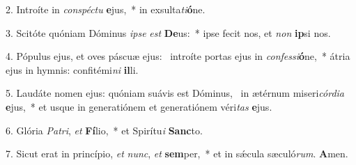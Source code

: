 2. Introíte in \textit{con}\textit{spéc}\textit{tu} \textbf{e}jus,~*  in exsulta\textit{ti}\textbf{ó}ne.\

3. Scitóte quóniam Dóminus \textit{ip}\textit{se} \textit{est} \textbf{De}us:~*  ipse fecit nos, et \textit{non} \textbf{ip}si nos.\

4. Pópulus ejus, et oves páscuæ ejus: \dag\  introíte portas ejus in \textit{con}\textit{fes}\textit{si}\textbf{ó}ne,~*  átria ejus in hymnis: confitémi\textit{ni} \textbf{il}li.\

5. Laudáte nomen ejus: quóniam suávis est Dóminus, \dag\  in ætérnum miseri\textit{cór}\textit{di}\textit{a} \textbf{e}jus,~*  et usque in generatiónem et generatiónem véri\textit{tas} \textbf{e}jus.\

6. Glória \textit{Pa}\textit{tri}, \textit{et} \textbf{Fí}lio,~*  et Spirítu\textit{i} \textbf{Sanc}to.\

7. Sicut erat in princípio, \textit{et} \textit{nunc}, \textit{et} \textbf{sem}per,~*  et in sǽcula sæculó\textit{rum}. \textbf{A}men.\

